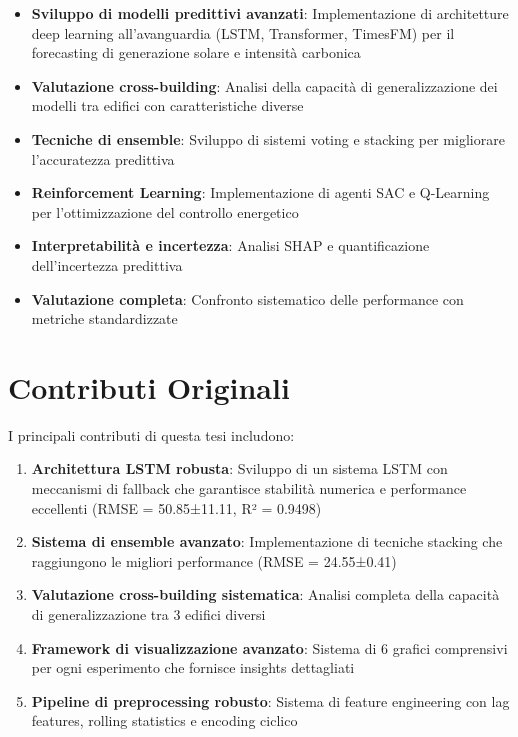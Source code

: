 \documentclass[12pt,a4paper,twoside]{report}
\begin{document}
\begin{itemize}
    \item \textbf{Sviluppo di modelli predittivi avanzati}: Implementazione di architetture deep learning all'avanguardia (LSTM, Transformer, TimesFM) per il forecasting di generazione solare e intensità carbonica
    
    \item \textbf{Valutazione cross-building}: Analisi della capacità di generalizzazione dei modelli tra edifici con caratteristiche diverse
    
    \item \textbf{Tecniche di ensemble}: Sviluppo di sistemi voting e stacking per migliorare l'accuratezza predittiva
    
    \item \textbf{Reinforcement Learning}: Implementazione di agenti SAC e Q-Learning per l'ottimizzazione del controllo energetico
    
    \item \textbf{Interpretabilità e incertezza}: Analisi SHAP e quantificazione dell'incertezza predittiva
    
    \item \textbf{Valutazione completa}: Confronto sistematico delle performance con metriche standardizzate
\end{itemize}

\section{Contributi Originali}

I principali contributi di questa tesi includono:

\begin{enumerate}
    \item \textbf{Architettura LSTM robusta}: Sviluppo di un sistema LSTM con meccanismi di fallback che garantisce stabilità numerica e performance eccellenti (RMSE = 50.85±11.11, R² = 0.9498)
    
    \item \textbf{Sistema di ensemble avanzato}: Implementazione di tecniche stacking che raggiungono le migliori performance (RMSE = 24.55±0.41)
    
    \item \textbf{Valutazione cross-building sistematica}: Analisi completa della capacità di generalizzazione tra 3 edifici diversi
    
    \item \textbf{Framework di visualizzazione avanzato}: Sistema di 6 grafici comprensivi per ogni esperimento che fornisce insights dettagliati
    
    \item \textbf{Pipeline di preprocessing robusto}: Sistema di feature engineering con lag features, rolling statistics e encoding ciclico
\end{enumerate}
\end{document}

